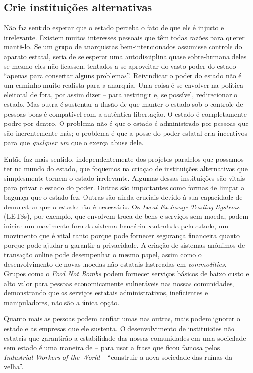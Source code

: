 \subsection*{Crie instituições alternativas}

Não faz sentido esperar que o estado perceba o fato de que ele é injusto e irrelevante. Existem muitos interesses pessoais que têm todas razões para querer mantê-lo. Se um grupo de anarquistas bem-intencionados assumisse controle do aparato estatal, seria de se esperar uma autodisciplina quase sobre-humana deles se mesmo eles não ficassem tentados a se aproveitar do vasto poder do estado ``apenas para consertar alguns problemas''. Reivindicar o poder do estado não é um caminho muito realista para a anarquia. Uma coisa é se envolver na política eleitoral de fora, por assim dizer -- para restringir e, se possível, redirecionar o estado. Mas outra é sustentar a ilusão de que manter o estado sob o controle de pessoas boas é compatível com a autêntica libertação. O estado é completamente podre por dentro. O problema não é que o estado é administrado por pessoas que são inerentemente más; o problema é que a posse do poder estatal cria incentivos para que \emph{qualquer um} que o exerça abuse dele.

Então faz mais sentido, independentemente dos projetos paralelos que possamos ter no mundo do estado, que foquemos na criação de instituições alternativas que simplesmente tornem o estado irrelevante. Algumas dessas instituições são vitais para privar o estado do poder. Outras são importantes como formas de limpar a bagunça que o estado fez. Outras são ainda cruciais devido à sua capacidade de demonstrar que o estado não é necessário. Os \emph{Local Exchange Trading Systems} (LETSs), por exemplo, que envolvem troca de bens e serviços sem moeda, podem iniciar um movimento fora do sistema bancário controlado pelo estado, um movimento que é vital tanto porque pode fornecer segurança financeira quanto porque pode ajudar a garantir a privacidade. A criação de sistemas anônimos de transação online pode desempenhar o mesmo papel, assim como o desenvolvimento de novas moedas não estatais lastreadas em \emph{commodities}. Grupos como o \emph{Food Not Bombs} podem fornecer serviços básicos de baixo custo e alto valor para pessoas economicamente vulneráveis nas nossas comunidades, demonstrando que os serviços estatais administrativos, ineficientes e manipuladores, não são a única opção.

Quanto mais as pessoas podem confiar umas nas outras, mais podem ignorar o estado e as empresas que ele sustenta. O desenvolvimento de instituições não estatais que garantirão a estabilidade das nossas comunidades em uma sociedade sem estado é uma maneira de -- para usar a frase que ficou famosa pelos \emph{Industrial Workers of the World} -- ``construir a nova sociedade das ruínas da velha''.

